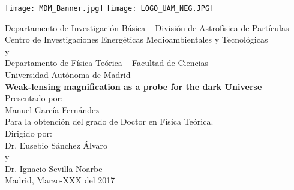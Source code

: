 \newpage
\thispagestyle{empty}
\begin{center}

\texttt{[image: MDM\_Banner.jpg]}
\texttt{[image: LOGO\_UAM\_NEG.JPG]}

\vspace{1cm}
Departamento de Investigaci\'on B\'asica -- Divisi\'on de Astrof\'isica de Part\'iculas\\
Centro de Investigaciones Energ\'eticas Medioambientales y Tecnol\'ogicas\\
\vspace{0.3cm}
y\\
\vspace{0.3cm}
Departamento de F\'isica Te\'orica -- Facultad de Ciencias\\
Universidad Aut\'onoma de Madrid\\
\vspace{3cm}
{\bf \LARGE Weak-lensing magnification as a probe for the dark Universe}\\
\vspace{3cm}
Presentado por:\\
Manuel Garc\'ia Fern\'andez\\
Para la obtenci\'on del grado de Doctor en F\'isica Te\'orica.\\
\vspace{1cm}
Dirigido por:\\
Dr. Eusebio S\'anchez \'Alvaro\\
y\\
Dr. Ignacio Sevilla Noarbe\\
\vspace{1cm}
Madrid, Marzo-XXX del 2017

\end{center}